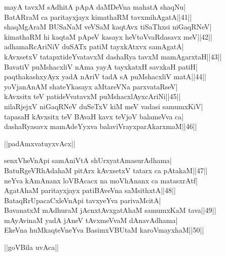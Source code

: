 \documentclass{article}
\begin{document}
mayA tavxM sAdhitA pApA daMDeVna mahatA shaqNu|\\
BatARraM ca paritayxjayx kimathaRM tavxmihAgatA||41||\\
shaqMgAraM BUSaNaM veVSaM kaqtAvx tiSaThxsi niGaqRNeV|\\
kimathaRM hi kaqtaM pApeV kasayx heVtoVvaRdasavx meV||42||\\
adhamaRcAriNiV duSATx patiM tayxkAtxvx samAgatA|\\
kAvxsetxV tatapxtideYvatavxM dashaRya tavxM mamAgarxtaH||43||\\
BavatiV puMshacxliV nAma yayA tayxkatxH savxkaH patiH|\\
paqthakashxyAyx yadA nAriV tadA sA puMshacxliV matA||44||\\
yoVjanAnAM shateYkasayx aMtareVNa parxvataRseV|\\
kAvxsitx teV patideVvatavxM puMshacxlAyxcAriNi||45||\\
nilaRjejxV niGaqRNeV duSeTxV kiM meV vadasi samumxKiV|\\
tapasaH kAvxsitx teV BAvaH kavx teVjoV balameVva ca|\\
dashaRyasavx mamAdeYyxva balaviVrayxparAkarxmaM||46||\\

\begin{center}
||padAmxvatuyxvAcx||
\end{center}

senxVheVnApi samAniVtA shUrxyatAmasurAdhama|\\
BatuRgeVRhAdahaM pitArx kAvxsetxV tatarx ca pAtakaM||47||\\
neYva kAmAnanx loVBAcacx na moVhAnanx ca matasxrAtf|\\
AgatAhaM paritayxjayx patiBAveVna saMsithxtA||48||\\
BataqRrUpacaCxleVnApi tavxyeYva parivaMcitA|\\
BavanatxM mAdhuraM jAcnxtAvxgatAhaM samumxKaM tava||49||\\
mAyAvinaM yadA jAneV tAvxmeVvaM dAnavAdhama|\\
EkeVna huMkaqteVneYva BasimxVBUtaM karoVmayxhaM||50||\\

\begin{center}
||goVBila uvAca||
\end{center}
\end{document}
